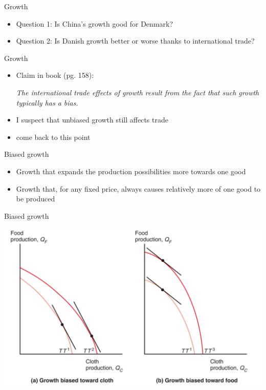 \documentclass[ignorenonframetext,]{beamer}
\begin{document}
\begin{frame}{Growth}

    \begin{itemize}
        \item Question 1: Is China's growth good for Denmark?
        \item Question 2: Is Danish growth better or worse thanks to international trade?
    \end{itemize}

\end{frame}

\begin{frame}{Growth} 

    \begin{itemize}
        \item Claim in book (pg. 158):

            \emph{The international trade effects of growth result from the fact that such growth typically has a bias.}

        \item I suspect that unbiased growth still affects trade
        \item come back to this point
    \end{itemize}

\end{frame}

\begin{frame}{Biased growth}

    \begin{itemize}
        \item Growth that expands the production possibilities more towards one good
        \item Growth that, for any fixed price, always causes relatively more of one good to be produced
    \end{itemize}

\end{frame}

\begin{frame}{Biased growth}

    \includegraphics[scale=0.25]{biased_growth.png}

\end{frame}
\end{document}
